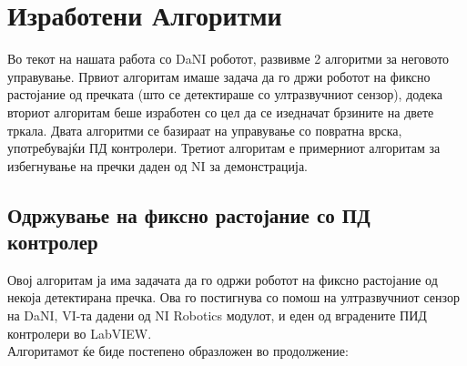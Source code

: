 \documentclass{article}
\begin{document}
\newpage

\section{Изработени Алгоритми}
Во текот на нашата работа со DaNI роботот, развивме 2 алгоритми за неговото управување. Првиот алгоритам имаше задача да го држи роботот на фиксно растојание од пречката (што се детектираше со ултразвучниот сензор), додека вториот алгоритам беше изработен со цел да се изедначат брзините на двете тркала. Двата алгоритми се базираат на управување со повратна врска, употребувајќи ПД контролери. Третиот алгоритам е примерниот алгоритам за избегнување на пречки даден од NI за демонстрација.

\subsection{Одржување на фиксно растојание со ПД контролер}
Овој алгоритам ја има задачата да го одржи роботот на фиксно растојание од некоја детектирана пречка. Ова го постигнува со помош на ултразвучниот сензор на DaNI, VI-та дадени од NI Robotics модулот, и еден од вградените ПИД контролери во LabVIEW.\\ Алгоритамот ќе биде постепено образложен во продолжение:
\end{document}
